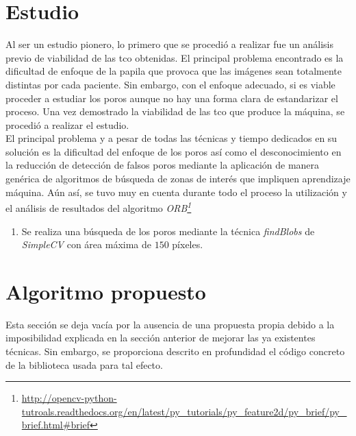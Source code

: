 \section{Estudio}
Al ser un estudio pionero, lo primero que se procedió a realizar fue
un análisis previo de viabilidad de las \gls{tco} obtenidas. El
principal problema encontrado es la dificultad de enfoque de la papila
que provoca que las imágenes sean totalmente distintas por cada
paciente. Sin embargo, con el enfoque adecuado, si es viable proceder
a estudiar los poros aunque no hay una forma clara de estandarizar el
proceso. Una vez demostrado la viabilidad de las \gls{tco} que produce
la máquina, se procedió a realizar el estudio.\\
El principal problema y a pesar de todas las técnicas y tiempo
dedicados en su solución es la dificultad del enfoque de los poros así
como el desconocimiento en la reducción de detección de falsos poros
mediante la aplicación de manera genérica de algoritmos de búsqueda de
zonas de interés que impliquen aprendizaje
máquina. Aún así, se tuvo muy en cuenta durante todo el proceso la
utilización y el análisis de resultados del algoritmo
\emph{ORB\footnote{\url{http://opencv-python-tutroals.readthedocs.org/en/latest/py\_tutorials/py\_feature2d/py\_brief/py\_brief.html\#brief}}\cite{orb-bib}}
\begin{enumerate}
\item Se realiza una búsqueda de los poros mediante la técnica
  \emph{findBlobs} de \emph{SimpleCV} con área máxima de $150$
  píxeles.
\end{enumerate}

\section{Algoritmo propuesto}
Esta sección se deja vacía por la ausencia de una propuesta propia
debido a la imposibilidad explicada en la sección anterior de mejorar
las ya existentes técnicas. Sin embargo, se proporciona descrito en
profundidad el código concreto de la biblioteca usada para tal efecto.

